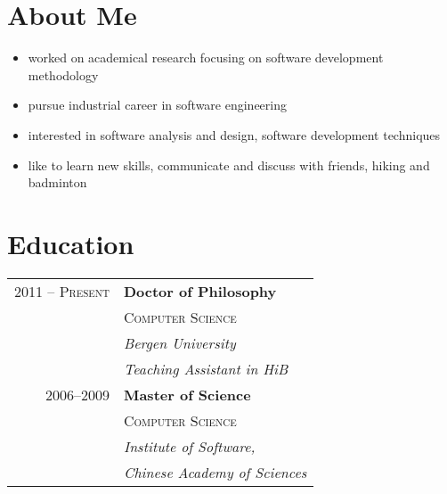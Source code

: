 \documentclass[10pt]{article} %
\begin{document}
{\begin{minipage}[t]{0.44\textwidth}
    \section{About Me}
    
    \begin{itemize}[label={\textcolor{shade}\textbullet}]
        \setlength{\itemsep}{0.1\baselineskip}
        \item worked on academical research focusing on software development methodology
        \item pursue industrial career in software engineering %
        \item interested in software analysis and design, software development techniques
        \item like to learn new skills, communicate and discuss with friends, hiking and badminton
    \end{itemize}
    
    \section{Education} 
    
    \begin{tabular}{rl} %
        
        
        2011 -- \textsc{Present} & \textbf{Doctor of Philosophy} \\ 
        & \textsc{Computer Science} \\ 
        & \textit{Bergen University}\\
        & \textit{Teaching Assistant in HiB}\\
        
        
        2006--2009 & \textbf{Master of Science} \\ 
        & \textsc{Computer Science} \\ 
        & \textit{Institute of Software,}\\
        & \textit{Chinese Academy of Sciences}
        

\end{tabular}
\end{minipage}}
\end{document}
